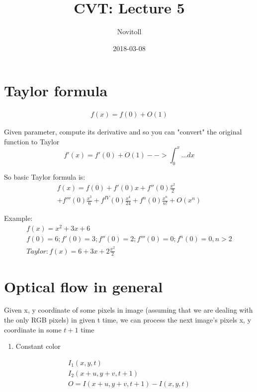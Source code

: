 \documentclass[11pt]{article}
\title{CVT: Lecture 5}
\date{2018-03-08}
\author{Novitoll}
\begin{document}
    \maketitle

    \section{Taylor formula} \label{sec:taylorformula}

    \begin{align}
        f(x) = f(0) + O(1)
    \end{align}

    Given parameter, compute its derivative and so you can "convert" the original function to Taylor
    \[
        f'(x) = f'(0) + O(1) --> \int_{0}^{x} ... dx
    \]

    So basic Taylor formula is:
    \begin{multline*}
        f(x) = f(0) + f'(0)x + f''(0)\frac{x^2}{2} \\
            + f'''(0)\frac{x^3}{6} + f^{IV}(0)\frac{x^4}{24} + f^n(0)\frac{x^n}{n!} + O(x^n)
    \end{multline*}

    Example:
    \begin{gather*}
        f(x) = x^2 + 3x + 6 \\
        f(0) = 6; f'(0) = 3; f''(0) = 2; f'''(0) = 0; f^n(0) = 0, n > 2 \\
        Taylor: f(x) = 6 + 3x + 2\frac{x^2}{2}
    \end{gather*}

    \section{Optical flow in general} \label{sec:optflowgeneral}

    Given x, y coordinate of some pixels in image (assuming that we are dealing with the only RGB pixels) in given t time,
    we can process the next image's pixels x, y coordinate in some $t + 1$ time

    \begin{enumerate}
        \item Constant color
    \end{enumerate}

    \begin{gather*}
        I_1(x, y, t) \\
        I_2(x + u, y + v, t + 1) \\
        O = I(x + u, y + v, t + 1) - I(x, y, t)
    \end{gather*}
\end{document}
